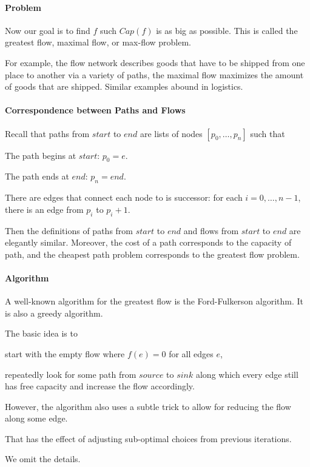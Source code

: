\paragraph{Problem}
Now our goal is to find $f$ such $Cap(f)$ is as big as possible.
This is called the greatest flow, maximal flow, or max-flow problem.

For example, the flow network describes goods that have to be shipped from one place to another via a variety of paths, the maximal flow maximizes the amount of goods that are shipped.
Similar examples abound in logistics.

\paragraph{Correspondence between Paths and Flows}
Recall that paths from $start$ to $end$ are lists of nodes $[p_0,\ldots,p_n]$ such that
\begin{compactitem}
 \item The path begins at $start$: $p_0=e$.
 \item The path ends at $end$: $p_n=end$.
 \item There are edges that connect each node to is successor: for each $i=0,\ldots,n-1$, there is an edge from $p_i$ to $p_i+1$.
\end{compactitem}

Then the definitions of paths from $start$ to $end$ and flows from $start$ to $end$ are elegantly similar.
Moreover, the cost of a path corresponds to the capacity of path, and the cheapest path problem corresponds to the greatest flow problem.

\paragraph{Algorithm}
A well-known algorithm for the greatest flow is the Ford-Fulkerson algorithm.
It is also a greedy algorithm.

The basic idea is to
\begin{compactitem}
\item start with the empty flow where $f(e)=0$ for all edges $e$,
\item repeatedly look for some path from $source$ to $sink$ along which every edge still has free capacity and increase the flow accordingly.
\end{compactitem}
However, the algorithm also uses a subtle trick to allow for reducing the flow along some edge.

That has the effect of adjusting sub-optimal choices from previous iterations.

We omit the details.